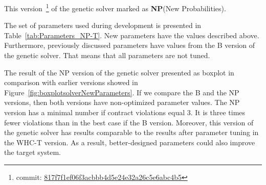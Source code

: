 This version~\footnote{commit: \href{https://git-st.inf.tu-dresden.de/mquat/mquat2/commit/817f7f1ef06f3acbbb4d5e24e32a26c5e6abc4b5}{817f7f1ef06f3acbbb4d5e24e32a26c5e6abc4b5}} of the genetic solver marked as \textbf{NP}(New Probabilities).

The set of parameters used during development is presented in Table~\ref{tab:Parameters_NP-T}. New parameters have the values described above. Furthermore, previously discussed parameters have values from the B version of the genetic solver. That means that all parameters are not tuned.

\begin{table}
	\centering
	\caption{Parameters of NP and NP-T versions of the genetic solver}\label{tab:Parameters_NP-T}
\end{table}

The result of the NP version of the genetic solver presented as boxplot in comparison with earlier versions showed in Figure~\ref{fig:boxplotsolverNewParameters}. If we compare the B and the NP versions, then both versions have non-optimized parameter values. The NP version has a minimal number if contract violations equal 3. It is three times fewer violations than in the best case if the B version. Moreover, this version of the genetic solver has results comparable to the results after parameter tuning in the WHC-T version. As a result, better-designed parameters could also improve the target system. 

